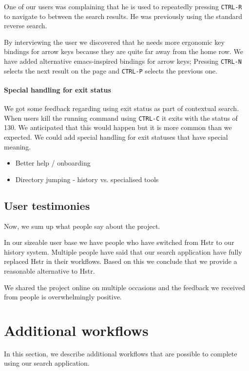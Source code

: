 One of our users was complaining that he is used to repeatedly pressing \verb|CTRL-R| to navigate to between the search results. He was previously using the standard reverse search.

By interviewing the user we discovered that he needs more ergonomic key bindings for arrow keys because they are quite far away from the home row. We have added alternative emacs-inspired bindings for arrow keys; Pressing \verb|CTRL-N| selects the next result on the page and \verb|CTRL-P| selects the previous one.   


\paragraph{Special handling for exit status}

We got some feedback regarding using exit status as part of contextual search. When users kill the running command using \verb|CTRL-C| it exits with the status of 130.
We anticipated that this would happen but it is more common than we expected.
We could add special handling for exit statuses that have special meaning.

\begin{itemize}
    \item Better help / onboarding
    \item Directory jumping - history vs. specialised tools
\end{itemize}

\subsection{User testimonies}

Now, we sum up what people say about the project. 

In our sizeable user base we have people who have switched from Hstr to our history system. Multiple people have said that our search application have fully replaced Hstr in their workflows. Based on this we conclude that we provide a reasonable alternative to Hstr.

We shared the project online on multiple occasions and the feedback we received from people is overwhelmingly positive.\cite{resh-feedback}

\section{Additional workflows}

In this section, we describe additional workflows that are possible to complete using our search application. 

